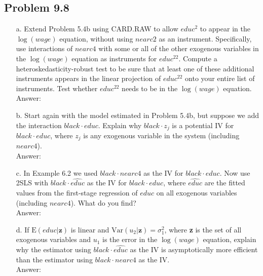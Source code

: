 \documentclass[10pt]{article}
\newcommand{\E}{\text{E}}
\newcommand{\V}{\text{Var}}
\begin{document}
\subsection*{Problem 9.8}
\begin{enumerate}
\item[a.] Extend Problem 5.4b using CARD.RAW to allow $educ^2$ to appear in the $\log(wage)$ equation, without using $nearc2$ as an instrument. Specifically, use interactions of $nearc4$ with some or all of the other exogenous variables in the $\log(wage)$ equation as instruments for $educ^22$. Compute a heteroskedasticity-robust test to be sure that at least one of these additional instruments appears in the linear projection of $educ^22$ onto your entire list of instruments. Test whether $educ^22$ needs to be in the $\log(wage)$ equation. 
\\ Answer:\\

\item[b.] Start again with the model estimated in Problem 5.4b, but suppose we add the interaction $black\cdot educ$. Explain why $black\cdot z_j$ is a potential IV for $black\cdot educ$, where $z_j$ is any exogenous variable in the system (including $nearc4$). 
\\ Answer:\\

\item[c.] In Example 6.2 we used $black\cdot nearc4$ as the IV for $black\cdot educ$. Now use 2SLS with $black\cdot\hat{educ}$ as the IV for $black\cdot educ$, where $\hat{educ}$ are the fitted values from the first-stage regression of $educ$ on all exogenous variables (including $nearc4$). What do you find? 
\\ Answer:\\

\item[d.] If $\E(educ|\textbf{z})$ is linear and $\V(u_2|\textbf{z})=\sigma_1^2$, where \textbf{z} is the set of all exogenous variables and $u_1$ is the error in the $\log(wage)$ equation, explain why the estimator using $black\cdot\hat{educ}$ as the IV is asymptotically more efficient than the estimator using $black\cdot nearc4$ as the IV.
\\ Answer:\\

\end{enumerate}
\end{document}
